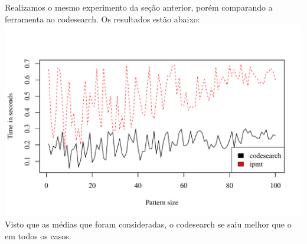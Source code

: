 \subsection{\rqthree}
Realizamos o mesmo experimento da seção anterior, porém comparando a ferramenta
\ipmt ao codesearch. Os resultados estão abaixo:
\\
\includegraphics[scale=0.74]{../experiments/R/pdf/rq3}
\\

Visto que as médias que foram consideradas, o codesearch se saiu melhor que o
\ipmt em todos os casos.


